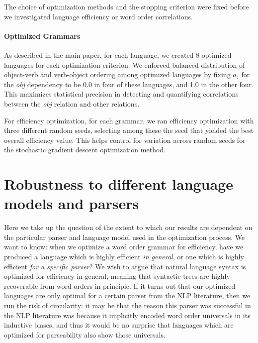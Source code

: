 \documentclass[10pt,twoside,lineno]{article}
\begin{document}
The choice of optimization methods and the stopping criterion were fixed before we investigated language efficiency or word order correlations.

\paragraph{Optimized Grammars}
As described in the main paper, for each language, we created 8 optimized languages for each optimization criterion.
We enforced balanced distribution of object-verb and verb-object ordering among optimized languages by fixing $a_\tau$ for the \textit{obj} dependency to be 0.0 in four of these languages, and 1.0 in the other four.
This maximizes statistical precision in detecting and quantifying correlations between the \textit{obj} relation and other relations.

For efficiency optimization, for each grammar, we ran efficiency optimization with three different random seeds, selecting among these the seed that yielded the best overall efficiency value.
This helps control for variation across random seeds for the stochastic gradient descent optimization method.




\section{Robustness to different language models and parsers}


Here we take up the question of the extent to which our results are dependent on the particular parser and language model used in the optimization process. We want to know: when we optimize a word order grammar for efficiency, have we produced a language which is highly efficient \emph{in general}, or one which is highly efficient \emph{for a specific parser}? We wish to argue that natural language syntax is optimized for efficiency in general, meaning that syntactic trees are highly recoverable from word orders in principle. If it turns out that our optimized languages are only optimal for a certain parser from the NLP literature, then we run the risk of circularity: it may be that the reason this parser was successful in the NLP literature was because it implicitly encoded word order universals in its inductive biases, and thus it would be no surprise that languages which are optimized for parseability also show those universals.
\end{document}

